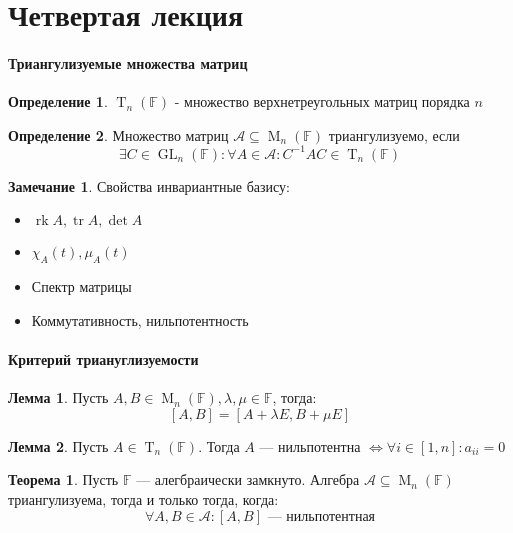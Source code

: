 \documentclass[a4paper, 14pt]{extarticle}
\theoremstyle{definition}
\newtheorem{definition}{Определение}
\newtheorem{theorem}{Теорема}
\newtheorem{note}{Замечание}
\newtheorem{lemma}{Лемма}
\begin{document}
\newpage

\section{Четвертая лекция}
\paragraph{Триангулизуемые множества матриц}

\begin{definition}
	\(\operatorname{T}_n(\mathbb{F})\) - множество верхнетреугольных матриц порядка \(n\)
\end{definition}

\begin{definition}
	Множество матриц \(\mathcal{A} \subseteq \operatorname{M}_n(\mathbb{F})\) триангулизуемо, если 
	\[\exists C \in \operatorname{GL}_n(\mathbb{F}) : \forall A \in \mathcal{A} : C^{-1}AC \in \operatorname{T}_n(\mathbb{F})\]
\end{definition}

\begin{note}
	Свойства инвариантные базису:
	\begin{itemize}
		\item \(\operatorname{rk}A, \operatorname{tr}A, \operatorname{det}A\)
		\item \(\chi_A(t), \mu_A(t)\)
		\item Спектр матрицы
		\item Коммутативность, нильпотентность
	\end{itemize}
\end{note}

\paragraph{Критерий триануглизуемости}

\begin{lemma}\label{lm4_1}
	Пусть \(A, B \in \operatorname{M}_n(\mathbb{F}), \lambda, \mu \in \mathbb{F}\), тогда:
	\[[A, B] = [A + \lambda E, B + \mu E]\]
\end{lemma}

\begin{lemma}\label{lm4_2}
	Пусть \(A \in \operatorname{T}_n(\mathbb{F})\). Тогда \(A\) --- нильпотентна \(\Leftrightarrow \forall i \in [1, n] : a_{ii} = 0\)
\end{lemma}

\begin{theorem}\label{th4_1}
	Пусть \(\mathbb{F}\) --- алегбраически замкнуто. Алгебра \(\mathcal{A} \subseteq \operatorname{M}_n(\mathbb{F})\) триангулизуема, тогда и только тогда, когда:
	\[\forall A, B \in \mathcal{A} : [A, B] \text{ --- нильпотентная}\]
\end{theorem}
\end{document}
